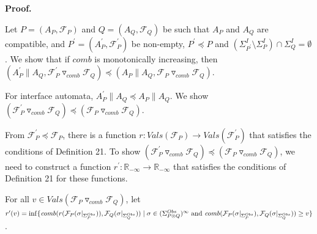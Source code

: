  
 
 
 
\par\medskip\noindent\textbf{Proof.}\par
 
 
Let $P=(A_{P},\mathcal{F}_{P})$ and $Q=(A_{Q},\mathcal{F}_{Q})$ be such that $A_{P}$ and $A_{Q}$ are compatible, and $P^{\prime}=(A_{P}^{\prime},\mathcal{F}_{P}^{\prime})$ be non-empty, $P^{\prime}\preceq P$ and $(\Sigma_{P^{\prime}}^{I}\setminus\Sigma_{P}^{I})\cap\Sigma_{Q}^{I}=\emptyset$. We show that if $\mathit{comb}$ is monotonically increasing, then $(A_{P}^{\prime}\parallel A_{Q},{{\mathcal{F}_{P}^{\prime}}\mathbin{\triangledown_{\mathit{comb}}}{\mathcal{F}_{Q}}})\preceq(A_{P}\parallel A_{Q},{{\mathcal{F}_{P}}\mathbin{\triangledown_{\mathit{comb}}}{\mathcal{F}_{Q}}})$.\par
 
 
 
For interface automata, $A_{P}^{\prime}\parallel A_{Q}\preceq A_{P}\parallel A_{Q}$. We show $({{\mathcal{F}_{P}^{\prime}}\mathbin{\triangledown_{\mathit{comb}}}{\mathcal{F}_{Q}}})\!\preceq\!({{\mathcal{F}_{P}}\mathbin{\triangledown_{\mathit{comb}}}{\mathcal{F}_{Q}}})$.\par
 
 
 
From $\mathcal{F}_{P}^{\prime}\preceq\mathcal{F}_{P}$, there is a function $r:Vals(\mathcal{F}_{P})\to Vals(\mathcal{F}_{P}^{\prime})$ that satisfies the conditions of Definition 21. To show $({{\mathcal{F}_{P}^{\prime}}\mathbin{\triangledown_{\mathit{comb}}}{\mathcal{F}_{Q}}})\preceq({{\mathcal{F}_{P}}\mathbin{\triangledown_{\mathit{comb}}}{\mathcal{F}_{Q}}})$, we need to construct a function $r^{\prime}:\mathbb{R}_{-\infty}\to\mathbb{R}_{-\infty}$ that satisfies the conditions of Definition 21 for these functions.\par
 
 
 
For all $v\in Vals({{\mathcal{F}_{P}}\mathbin{\triangledown_{\mathit{comb}}}{\mathcal{F}_{Q}}})$, let $r^{\prime}(v)=\inf\{\mathit{comb}(r(\mathcal{F}_{P}(\sigma|_{\Sigma_{P}^{Obs}})),\mathcal{F}_{Q}(\sigma|_{\Sigma_{Q}^{Obs}}))\mid\\
\sigma\in(\Sigma_{P\otimes Q}^{Obs})^{\infty}\text{ and }\mathit{comb}(\mathcal{F}_{P}(\sigma|_{\Sigma_{P}^{Obs}}),\mathcal{F}_{Q}(\sigma|_{\Sigma_{Q}^{Obs}}))\geq v\}$.\par
 
